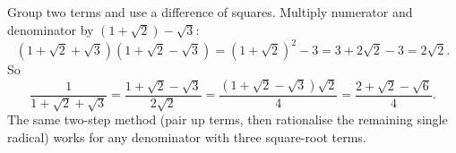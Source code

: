 Group two terms and use a difference of squares. Multiply numerator and denominator by $\left(1+\sqrt2\right)-\sqrt3$:
\[
\left(1+\sqrt2+\sqrt3\right)\left(1+\sqrt2-\sqrt3\right)=\left(1+\sqrt2\right)^2-3=3+2\sqrt2-3=2\sqrt2 .
\]
So
\[
\dfrac{1}{1+\sqrt2+\sqrt3}=\dfrac{1+\sqrt2-\sqrt3}{2\sqrt2}=\dfrac{\left(1+\sqrt2-\sqrt3\right)\sqrt2}{4}=\boxed{\dfrac{2+\sqrt2-\sqrt6}{4}}.
\]
The same two-step method (pair up terms, then rationalise the remaining single radical) works for any denominator with three square-root terms.

